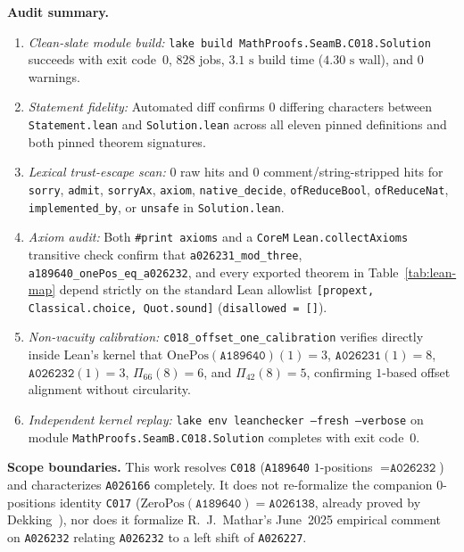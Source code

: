 \documentclass[11pt]{article}
\theoremstyle{definition}
\newcommand{\seq}[1]{\texttt{#1}}
\newcommand{\OnePos}{\mathrm{OnePos}}
\newcommand{\ZeroPos}{\mathrm{ZeroPos}}
\begin{document}
\noindent\textbf{Audit summary.}
\begin{enumerate}
\item \emph{Clean-slate module build:} \nolinkurl{lake build MathProofs.SeamB.C018.Solution} succeeds with exit code~$0$, $828$ jobs, $3.1\text{ s}$ build time ($4.30\text{ s}$ wall), and $0$ warnings.
\item \emph{Statement fidelity:} Automated diff confirms $0$ differing characters between \texttt{Statement.lean} and \texttt{Solution.lean} across all eleven pinned definitions and both pinned theorem signatures.
\item \emph{Lexical trust-escape scan:} $0$ raw hits and $0$ comment/string-stripped hits for \texttt{sorry}, \texttt{admit}, \texttt{sorryAx}, \texttt{axiom}, \texttt{native\_decide}, \texttt{ofReduceBool}, \texttt{ofReduceNat}, \texttt{implemented\_by}, or \texttt{unsafe} in \texttt{Solution.lean}.
\item \emph{Axiom audit:} Both \texttt{\#print axioms} and a \texttt{CoreM} \texttt{Lean.collectAxioms} transitive check confirm that \texttt{a026231\_mod\_three}, \texttt{a189640\_onePos\_eq\_a026232}, and every exported theorem in Table~\ref{tab:lean-map} depend strictly on the standard Lean allowlist \texttt{[propext, Classical.choice, Quot.sound]} (\texttt{disallowed = []}).
\item \emph{Non-vacuity calibration:} \texttt{c018\_offset\_one\_calibration} verifies directly inside Lean's kernel that $\OnePos(\seq{A189640})(1) = 3$, $\seq{A026231}(1) = 8$, $\seq{A026232}(1) = 3$, $\Pi_{66}(8) = 6$, and $\Pi_{42}(8) = 5$, confirming $1$-based offset alignment without circularity.
\item \emph{Independent kernel replay:}
\texttt{lake env leanchecker --fresh --verbose} on module \nolinkurl{MathProofs.SeamB.C018.Solution} completes with exit code~$0$.
\end{enumerate}

\noindent\textbf{Scope boundaries.}
This work resolves \texttt{C018} (\seq{A189640} $1$-positions $= \seq{A026232}$) and characterizes \seq{A026166} completely. It does not re-formalize the companion $0$-positions identity \texttt{C017} ($\ZeroPos(\seq{A189640}) = \seq{A026138}$, already proved by Dekking~\cite{dekking2020}), nor does it formalize R.~J.\ Mathar's June~2025 empirical comment on \seq{A026232} relating \seq{A026232} to a left shift of \seq{A026227}.
\end{document}
